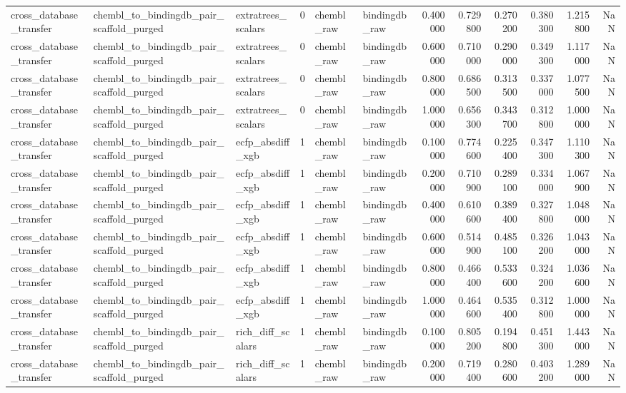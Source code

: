 \begin{longtable}{lllrllrrrrrr}
cross\_database\_transfer & chembl\_to\_bindingdb\_pair\_scaffold\_purged & extratrees\_scalars & 0 & chembl\_raw & bindingdb\_raw & 0.400000 & 0.729800 & 0.270200 & 0.380300 & 1.215800 & NaN \\
cross\_database\_transfer & chembl\_to\_bindingdb\_pair\_scaffold\_purged & extratrees\_scalars & 0 & chembl\_raw & bindingdb\_raw & 0.600000 & 0.710000 & 0.290000 & 0.349300 & 1.117000 & NaN \\
cross\_database\_transfer & chembl\_to\_bindingdb\_pair\_scaffold\_purged & extratrees\_scalars & 0 & chembl\_raw & bindingdb\_raw & 0.800000 & 0.686500 & 0.313500 & 0.337000 & 1.077500 & NaN \\
cross\_database\_transfer & chembl\_to\_bindingdb\_pair\_scaffold\_purged & extratrees\_scalars & 0 & chembl\_raw & bindingdb\_raw & 1.000000 & 0.656300 & 0.343700 & 0.312800 & 1.000000 & NaN \\
cross\_database\_transfer & chembl\_to\_bindingdb\_pair\_scaffold\_purged & ecfp\_absdiff\_xgb & 1 & chembl\_raw & bindingdb\_raw & 0.100000 & 0.774600 & 0.225400 & 0.347300 & 1.110300 & NaN \\
cross\_database\_transfer & chembl\_to\_bindingdb\_pair\_scaffold\_purged & ecfp\_absdiff\_xgb & 1 & chembl\_raw & bindingdb\_raw & 0.200000 & 0.710900 & 0.289100 & 0.334000 & 1.067900 & NaN \\
cross\_database\_transfer & chembl\_to\_bindingdb\_pair\_scaffold\_purged & ecfp\_absdiff\_xgb & 1 & chembl\_raw & bindingdb\_raw & 0.400000 & 0.610600 & 0.389400 & 0.327800 & 1.048000 & NaN \\
cross\_database\_transfer & chembl\_to\_bindingdb\_pair\_scaffold\_purged & ecfp\_absdiff\_xgb & 1 & chembl\_raw & bindingdb\_raw & 0.600000 & 0.514900 & 0.485100 & 0.326200 & 1.043000 & NaN \\
cross\_database\_transfer & chembl\_to\_bindingdb\_pair\_scaffold\_purged & ecfp\_absdiff\_xgb & 1 & chembl\_raw & bindingdb\_raw & 0.800000 & 0.466400 & 0.533600 & 0.324200 & 1.036600 & NaN \\
cross\_database\_transfer & chembl\_to\_bindingdb\_pair\_scaffold\_purged & ecfp\_absdiff\_xgb & 1 & chembl\_raw & bindingdb\_raw & 1.000000 & 0.464600 & 0.535400 & 0.312800 & 1.000000 & NaN \\
cross\_database\_transfer & chembl\_to\_bindingdb\_pair\_scaffold\_purged & rich\_diff\_scalars & 1 & chembl\_raw & bindingdb\_raw & 0.100000 & 0.805200 & 0.194800 & 0.451300 & 1.443000 & NaN \\
cross\_database\_transfer & chembl\_to\_bindingdb\_pair\_scaffold\_purged & rich\_diff\_scalars & 1 & chembl\_raw & bindingdb\_raw & 0.200000 & 0.719400 & 0.280600 & 0.403200 & 1.289000 & NaN \\

\end{longtable}
